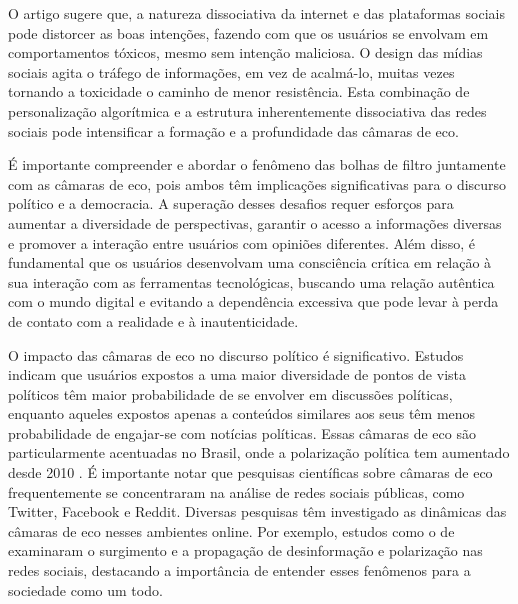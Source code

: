 O artigo  sugere que, a natureza dissociativa da internet e das plataformas sociais pode distorcer as boas intenções, fazendo com que os usuários se envolvam em comportamentos tóxicos, mesmo sem intenção maliciosa. O design das mídias sociais agita o tráfego de informações, em vez de acalmá-lo, muitas vezes tornando a toxicidade o caminho de menor resistência. Esta combinação de personalização algorítmica e a estrutura inherentemente dissociativa das redes sociais pode intensificar a formação e a profundidade das câmaras de eco.

É importante compreender e abordar o fenômeno das bolhas de filtro juntamente com as câmaras de eco, pois ambos têm implicações significativas para o discurso político e a democracia. A superação desses desafios requer esforços para aumentar a diversidade de perspectivas, garantir o acesso a informações diversas e promover a interação entre usuários com opiniões diferentes. Além disso, é fundamental que os usuários desenvolvam uma consciência crítica em relação à sua interação com as ferramentas tecnológicas, buscando uma relação autêntica com o mundo digital e evitando a dependência excessiva que pode levar à perda de contato com a realidade e à inautenticidade.

O impacto das câmaras de eco no discurso político é significativo. Estudos indicam que usuários expostos a uma maior diversidade de pontos de vista políticos têm maior probabilidade de se envolver em discussões políticas, enquanto aqueles expostos apenas a conteúdos similares aos seus têm menos probabilidade de engajar-se com notícias políticas. Essas câmaras de eco são particularmente acentuadas no Brasil, onde a polarização política tem aumentado desde 2010 \cite{2022_Ortellado}. É importante notar que pesquisas científicas sobre câmaras de eco frequentemente se concentraram na análise de redes sociais públicas, como Twitter, Facebook e Reddit. Diversas pesquisas têm investigado as dinâmicas das câmaras de eco nesses ambientes online. Por exemplo, estudos como o de  examinaram o surgimento e a propagação de desinformação e polarização nas redes sociais, destacando a importância de entender esses fenômenos para a sociedade como um todo.

